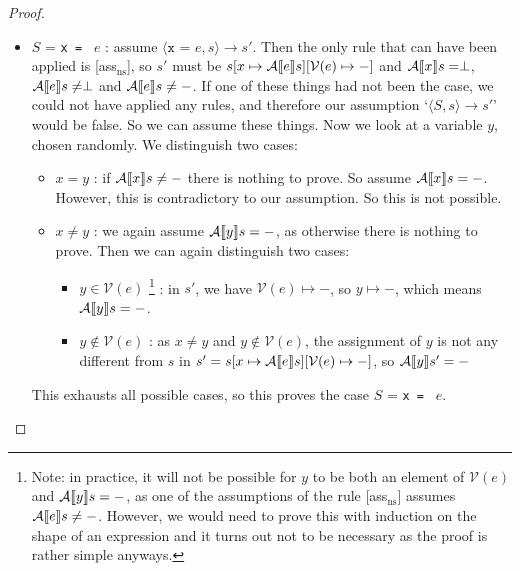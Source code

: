 \begin{proof}
\begin{itemize}[noitemsep]
    \item $S$ = \texttt{x = } $e$ : assume $\langle \texttt{x = } e, s \rangle \to s'$. Then the only rule that can have been applied is [ass$_{\textrm{ns}}$], so  $s'$ must be $s[x \mapsto \mathcal{A} \llbracket e \rrbracket s][\mathcal{V}(e)\mapsto-]$ and $\mathcal{A} \llbracket x \rrbracket s = \perp$, $\mathcal{A} \llbracket e \rrbracket s \neq \perp$ and $\mathcal{A} \llbracket e \rrbracket s \neq -$. If one of these things had not been the case, we could not have applied any rules, and therefore our assumption `$\langle S, s \rangle \to s'$' would be false. So we can assume these things. Now we look at a variable $y$, chosen randomly. We distinguish two cases:
    \begin{itemize}
        \item $x=y$ : if $\mathcal{A} \llbracket x \rrbracket s \not = -$ there is nothing to prove. So assume $\mathcal{A} \llbracket x \rrbracket s = -$. However, this is contradictory to our assumption. So this is not possible.
        \item $x\not = y$ : we again assume $\mathcal{A} \llbracket y \rrbracket s = -$, as otherwise there is nothing to prove. Then we can again distinguish two cases: 
        \begin{itemize}
            \item $y \in \mathcal{V}(e)$ \footnote{Note: in practice, it will not be possible for $y$ to be both an element of $\mathcal{V}(e)$ and $\mathcal{A} \llbracket y \rrbracket s = -$, as one of the assumptions of the rule [ass$_{\textrm{ns}}$] assumes $\mathcal{A} \llbracket e \rrbracket s \neq -$. However, we would need to prove this with induction on the shape of an expression and it turns out not to be necessary as the proof is rather simple anyways.} : in $s'$, we have $\mathcal{V}(e)\mapsto-$, so $y \mapsto -$, which means $\mathcal{A} \llbracket y \rrbracket s = -$.
            \item $y \not \in \mathcal{V}(e)$ : as $x \not = y$ and $y \not \in \mathcal{V}(e)$, the assignment of $y$ is not any different from $s$ in $s'=s[x \mapsto \mathcal{A} \llbracket e \rrbracket s][\mathcal{V}(e)\mapsto-]$, so $\mathcal{A} \llbracket y \rrbracket s' = -$
        \end{itemize}
    \end{itemize}
    This exhausts all possible cases, so this proves the case $S$ = \texttt{x = } $e$.
    

\end{itemize}
\end{proof}
